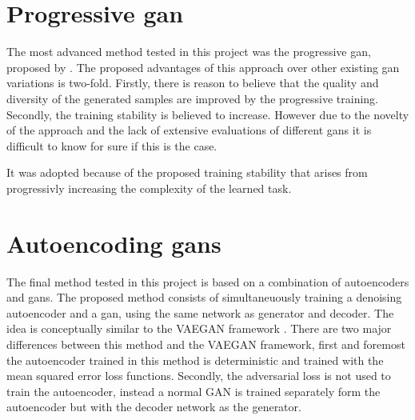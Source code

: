 \section{Progressive \acrshort{gan}}
The most advanced method tested in this project was the progressive \acrshort{gan}, proposed by \textcite{karras2017progressive}. The proposed advantages of this approach over other existing \acrshort{gan} variations is two-fold. Firstly, there is reason to believe that the quality and diversity of the generated samples are improved by the progressive training. Secondly, the training stability is believed to increase. However due to the novelty of the approach and the lack of extensive evaluations of different \acrshort{gans} it is difficult to know for sure if this is the case.

It was adopted because of the proposed training stability that arises from progressivly increasing the complexity of the learned task. 




\section{Autoencoding \acrshort{gans}}
The final method tested in this project is based on a combination of autoencoders and \acrshort{gans}. The proposed method consists of simultaneuously training a denoising autoencoder and a \acrshort{gan}, using the same network as generator and decoder. The idea is conceptually similar to the VAEGAN framework \parencite{LarsenSW15autoencodingbeyond}. There are two major differences between this method and the VAEGAN framework, first and foremost the autoencoder trained in this method is deterministic and trained with the mean squared error loss functions. Secondly, the adversarial loss is not used to train the autoencoder, instead a normal GAN is trained separately form the autoencoder but with the decoder network as the generator. 

